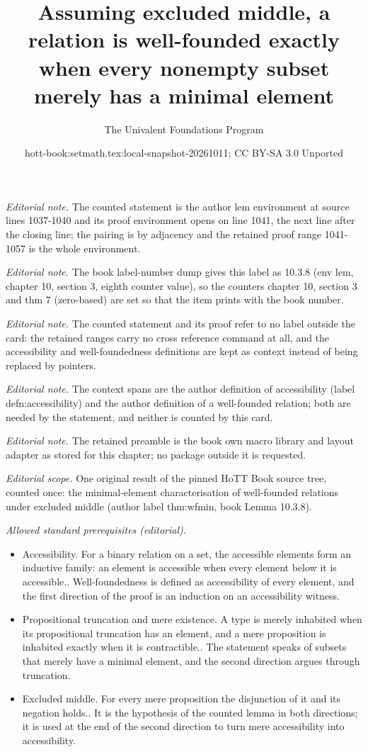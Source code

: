 \documentclass[10pt,a4paper]{article}
\title{Assuming excluded middle, a relation is well-founded exactly when every nonempty subset merely has a minimal element}
\author{The Univalent Foundations Program}
\date{hott-book:setmath.tex:local-snapshot-20261011; CC BY-SA 3.0 Unported}
\newcounter{chapter}
\theoremstyle{definition}
\theoremstyle{remark}
\numberwithin{equation}{section}
\begin{document}
\maketitle
\setcounter{chapter}{10}
\setcounter{section}{3}
\setcounter{thm}{7}
\noindent\textit{Editorial note.} The counted statement is the author lem environment at source lines 1037-1040 and its proof environment opens on line 1041, the next line after the closing line; the pairing is by adjacency and the retained proof range 1041-1057 is the whole environment.\par\medskip
\noindent\textit{Editorial note.} The book label-number dump gives this label as 10.3.8 (env lem, chapter 10, section 3, eighth counter value), so the counters chapter 10, section 3 and thm 7 (zero-based) are set so that the item prints with the book number.\par\medskip
\noindent\textit{Editorial note.} The counted statement and its proof refer to no label outside the card: the retained ranges carry no cross reference command at all, and the accessibility and well-foundedness definitions are kept as context instead of being replaced by pointers.\par\medskip
\noindent\textit{Editorial note.} The context spans are the author definition of accessibility (label defn:accessibility) and the author definition of a well-founded relation; both are needed by the statement, and neither is counted by this card.\par\medskip
\noindent\textit{Editorial note.} The retained preamble is the book own macro library and layout adapter as stored for this chapter; no package outside it is requested.\par\medskip
\noindent\textit{Editorial scope.} One original result of the pinned HoTT Book source tree, counted once: the minimal-element characterisation of well-founded relations under excluded middle (author label thm:wfmin, book Lemma 10.3.8).\par\medskip
\noindent\textit{Allowed standard prerequisites (editorial).}\begin{itemize}
\item Accessibility. For a binary relation on a set, the accessible elements form an inductive family: an element is accessible when every element below it is accessible.. Well-foundedness is defined as accessibility of every element, and the first direction of the proof is an induction on an accessibility witness.
\item Propositional truncation and mere existence. A type is merely inhabited when its propositional truncation has an element, and a mere proposition is inhabited exactly when it is contractible.. The statement speaks of subsets that merely have a minimal element, and the second direction argues through truncation.
\item Excluded middle. For every mere proposition the disjunction of it and its negation holds.. It is the hypothesis of the counted lemma in both directions; it is used at the end of the second direction to turn mere accessibility into accessibility.
\end{itemize}\medskip
\end{document}
